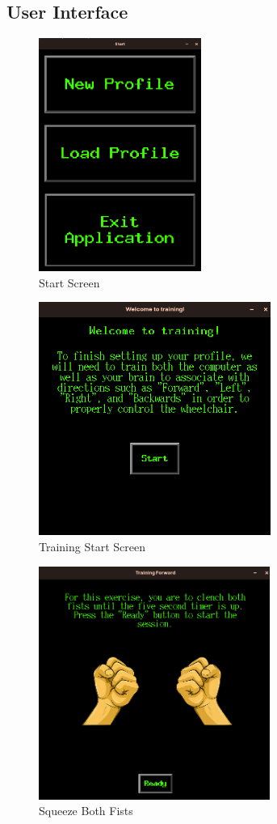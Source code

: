 \documentclass[conference]{IEEEtran}
\begin{document}
\twocolumn
\subsection{User Interface}

\begin{figure}[h]
    \centering
    \includegraphics[keepaspectratio, height=3in]{figs/H/ui0.png}
    \caption{Start Screen}
    \label{fig:start_screen}
\end{figure}
\begin{figure}[h]
    \centering
    \includegraphics[keepaspectratio, height=3in]{figs/H/ui1.png}
    \caption{Training Start Screen}
    \label{fig:training_start}
\end{figure}
\begin{figure}[h]
    \centering
    \includegraphics[keepaspectratio, height=3in]{figs/H/ui2.png}
    \caption{Squeeze Both Fists}
    \label{fig:squeeze_fists}
\end{figure}
\end{document}
